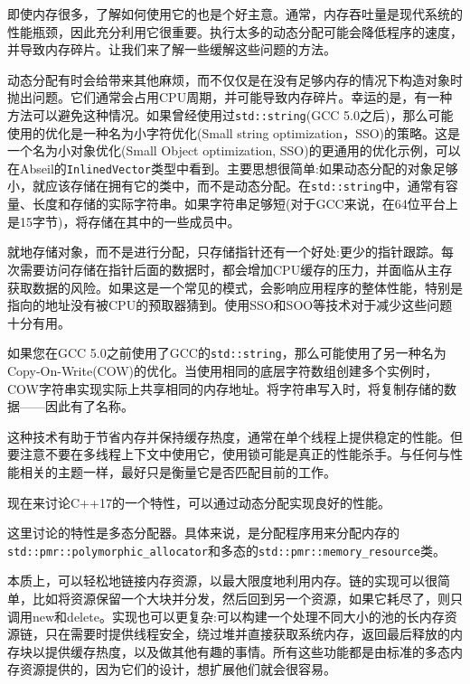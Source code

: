 

即使内存很多，了解如何使用它的也是个好主意。通常，内存吞吐量是现代系统的性能瓶颈，因此充分利用它很重要。执行太多的动态分配可能会降低程序的速度，并导致内存碎片。让我们来了解一些缓解这些问题的方法。


动态分配有时会给带来其他麻烦，而不仅仅是在没有足够内存的情况下构造对象时抛出问题。它们通常会占用CPU周期，并可能导致内存碎片。幸运的是，有一种方法可以避免这种情况。如果曾经使用过\texttt{std::string}(GCC 5.0之后)，那么可能使用的优化是一种名为小字符优化(Small string optimization，SSO)的策略。这是一个名为小对象优化(Small Object optimization, SSO)的更通用的优化示例，可以在Abseil的\texttt{InlinedVector}类型中看到。主要思想很简单:如果动态分配的对象足够小，就应该存储在拥有它的类中，而不是动态分配。在\texttt{std::string}中，通常有容量、长度和存储的实际字符串。如果字符串足够短(对于GCC来说，在64位平台上是15字节)，将存储在其中的一些成员中。

就地存储对象，而不是进行分配，只存储指针还有一个好处:更少的指针跟踪。每次需要访问存储在指针后面的数据时，都会增加CPU缓存的压力，并面临从主存获取数据的风险。如果这是一个常见的模式，会影响应用程序的整体性能，特别是指向的地址没有被CPU的预取器猜到。使用SSO和SOO等技术对于减少这些问题十分有用。


如果您在GCC 5.0之前使用了GCC的\texttt{std::string}，那么可能使用了另一种名为Copy-On-Write(COW)的优化。当使用相同的底层字符数组创建多个实例时，COW字符串实现实际上共享相同的内存地址。将字符串写入时，将复制存储的数据——因此有了名称。

这种技术有助于节省内存并保持缓存热度，通常在单个线程上提供稳定的性能。但要注意不要在多线程上下文中使用它，使用锁可能是真正的性能杀手。与任何与性能相关的主题一样，最好只是衡量它是否匹配目前的工作。

现在来讨论C++17的一个特性，可以通过动态分配实现良好的性能。


这里讨论的特性是多态分配器。具体来说，是分配程序用来分配内存的\texttt{std::pmr::polymorphic\_allocator}和多态的\texttt{std::pmr::memory\_resource}类。

本质上，可以轻松地链接内存资源，以最大限度地利用内存。链的实现可以很简单，比如将资源保留一个大块并分发，然后回到另一个资源，如果它耗尽了，则只调用new和delete。实现也可以更复杂:可以构建一个处理不同大小的池的长内存资源链，只在需要时提供线程安全，绕过堆并直接获取系统内存，返回最后释放的内存块以提供缓存热度，以及做其他有趣的事情。所有这些功能都是由标准的多态内存资源提供的，因为它们的设计，想扩展他们就会很容易。


